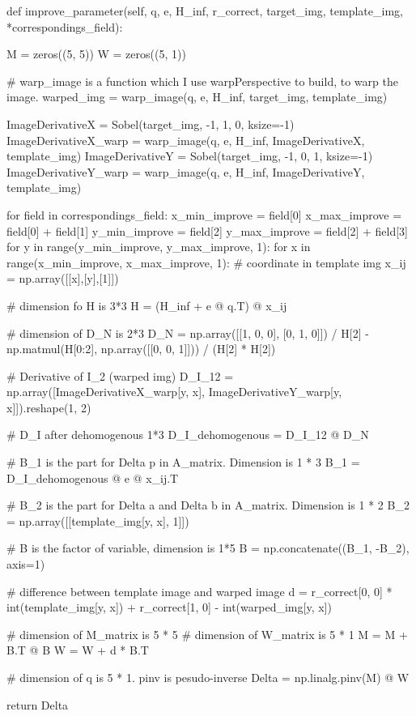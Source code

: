 \begin{python}[caption={Dyadic product example},label={lst:Dyadic Product Example}]
def improve_parameter(self, q, e, H_inf, r_correct, target_img, template_img, *correspondings_field):
	
	M = zeros((5, 5))
	W = zeros((5, 1))
	
	# warp_image is a function which I use warpPerspective to build, to warp the image.
	warped_img = warp_image(q, e, H_inf, target_img, template_img)
	
	ImageDerivativeX = Sobel(target_img, -1, 1, 0, ksize=-1)
	ImageDerivativeX_warp = warp_image(q, e, H_inf, ImageDerivativeX, template_img)
	ImageDerivativeY = Sobel(target_img, -1, 0, 1, ksize=-1)
	ImageDerivativeY_warp = warp_image(q, e, H_inf, ImageDerivativeY, template_img)
	
	for field in correspondings_field:
		x_min_improve = field[0]
		x_max_improve = field[0] + field[1]
		y_min_improve = field[2]
		y_max_improve = field[2] + field[3]
		for y in range(y_min_improve, y_max_improve, 1):
			for x in range(x_min_improve, x_max_improve, 1):
				# coordinate in template img
				x_ij = np.array([[x],[y],[1]])
				
				# dimension fo H is 3*3
				H = (H_inf + e @ q.T) @ x_ij
				
				# dimension of D_N is 2*3
				D_N = np.array([[1, 0, 0], [0, 1, 0]]) / H[2] - np.matmul(H[0:2], np.array([[0, 0, 1]])) / (H[2] * H[2])
				
				# Derivative of I_2 (warped img)
				D_I_12 = np.array([ImageDerivativeX_warp[y, x], ImageDerivativeY_warp[y, x]]).reshape(1, 2)
				
				# D_I after dehomogenous 1*3
				D_I_dehomogenous = D_I_12 @ D_N
				
				# B_1 is the part for Delta p in A_matrix. Dimension is 1 * 3
				B_1 = D_I_dehomogenous @ e @ x_ij.T
				
				# B_2 is the part for Delta a and Delta b in A_matrix. Dimension is 1 * 2
				B_2 = np.array([[template_img[y, x], 1]])
				
				# B is the factor of variable, dimension is 1*5
				B = np.concatenate((B_1, -B_2), axis=1)
				
				# difference between template image and warped image
				d = r_correct[0, 0] * int(template_img[y, x]) + r_correct[1, 0] - int(warped_img[y, x])
				
				# dimension of M_matrix is 5 * 5
				# dimension of W_matrix is 5 * 1
				M = M + B.T @ B
				W = W + d * B.T
	
	# dimension of q is 5 * 1. pinv is pesudo-inverse
	Delta = np.linalg.pinv(M) @ W
	
	return Delta
\end{python}









